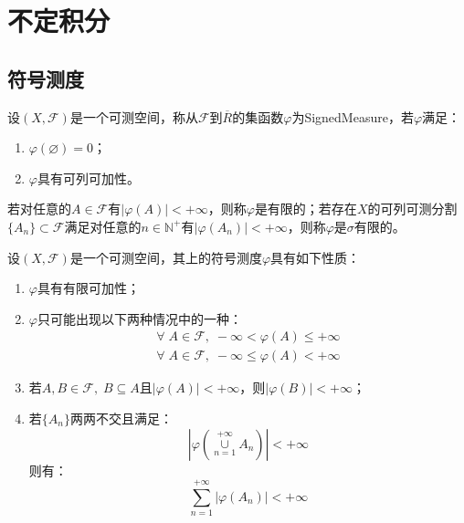 \section{不定积分}

\subsection{符号测度}
\begin{definition}
	设$(X,\mathscr{F})$是一个可测空间，称从$\mathscr{F}$到$\overline{R}$的集函数$\varphi$为\gls{SignedMeasure}，若$\varphi$满足：
	\begin{enumerate}
		\item $\varphi(\varnothing)=0$；
		\item $\varphi$具有可列可加性。
	\end{enumerate}
	若对任意的$A\in\mathscr{F}$有$|\varphi(A)|<+\infty$，则称$\varphi$是有限的；若存在$X$的可列可测分割$\{A_n\}\subset\mathscr{F}$满足对任意的$n\in\mathbb{N}^+$有$|\varphi(A_n)|<+\infty$，则称$\varphi$是$\sigma$有限的。
\end{definition}
\begin{property}
	设$(X,\mathscr{F})$是一个可测空间，其上的符号测度$\varphi$具有如下性质：
	\begin{enumerate}
		\item $\varphi$具有有限可加性；
		\item $\varphi$只可能出现以下两种情况中的一种：
		\begin{gather*}
			\forall\;A\in\mathscr{F},\;-\infty<\varphi(A)\leqslant+\infty \\
			\forall\;A\in\mathscr{F},\;-\infty\leqslant\varphi(A)<+\infty
		\end{gather*}
		\item 若$A,B\in\mathscr{F},\;B\subseteq A$且$|\varphi(A)|<+\infty$，则$|\varphi(B)|<+\infty$；
		\item 若$\{A_n\}$两两不交且满足：
		\begin{equation*}
			\left|\varphi\left(\underset{n=1}{\overset{+\infty}{\cup}}A_n\right)\right|<+\infty
		\end{equation*}
		则有：
		\begin{equation*}
			\sum_{n=1}^{+\infty}|\varphi(A_n)|<+\infty
		\end{equation*}
	\end{enumerate}
\end{property}

